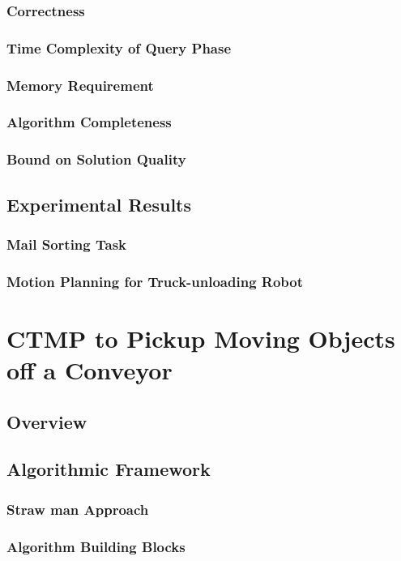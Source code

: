 \documentclass[a4paper,10pt]{article}
\begin{document}
\subsubsection{Correctness}
\subsubsection{Time Complexity of Query Phase}
\subsubsection{Memory Requirement}
\subsubsection{Algorithm Completeness}
\subsubsection{Bound on Solution Quality}
\subsection{Experimental Results}
\subsubsection{Mail Sorting Task}
\subsubsection{Motion Planning for Truck-unloading Robot}

\section{CTMP to Pickup Moving Objects off a Conveyor}
\subsection{Overview}
\subsection{Algorithmic Framework}
\subsubsection{Straw man Approach}
\subsubsection{Algorithm Building Blocks}
\end{document}
